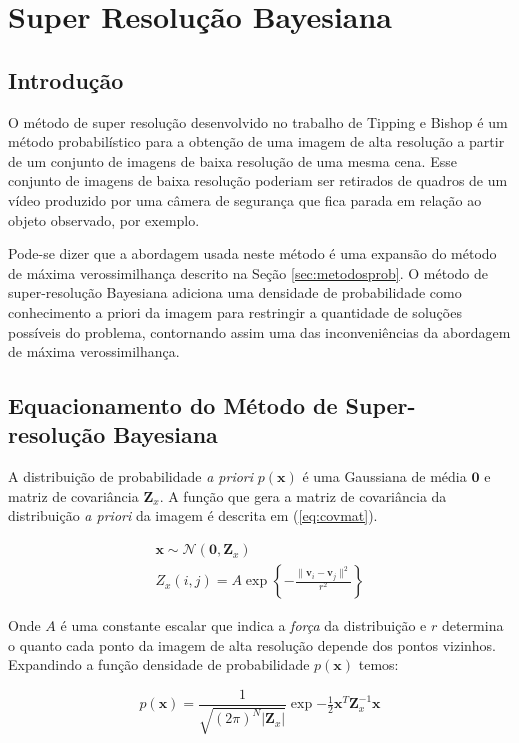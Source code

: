 \chapter{Super Resolução Bayesiana}
\label{chap:srbayes}
\section{Introdução}
O método de super resolução desenvolvido no trabalho de Tipping e Bishop \cite{tipping2003bayesian} é um método probabilístico para a obtenção de uma imagem de alta resolução
a partir de um conjunto de imagens de baixa resolução de uma mesma cena.
Esse conjunto de imagens de baixa resolução poderiam ser retirados de quadros de um
vídeo produzido por uma câmera de segurança que fica parada em relação ao objeto
observado, por exemplo.

Pode-se dizer que a abordagem usada neste método é uma expansão do método de máxima
verossimilhança descrito na Seção \ref{sec:metodosprob}.
O método de super-resolução Bayesiana adiciona uma densidade de probabilidade como
conhecimento a priori da imagem para restringir a quantidade de soluções possíveis do
problema, contornando assim uma das inconveniências da abordagem de máxima verossimilhança.


\section{Equacionamento do Método de Super-resolução Bayesiana}
A distribuição de probabilidade \emph{a priori} $p(\mathbf{x})$ é uma Gaussiana de média $\mathbf{0}$ e matriz de covariância $\mathbf{Z}_x$. A função que gera a matriz de covariância da distribuição \emph{a priori} da imagem é descrita em (\ref{eq:covmat}).

\begin{gather}
	\mathbf{x} \sim \mathcal{N}(\mathbf{0}, \mathbf{Z}_x) \\ 
	\label{eq:covmat} Z_x(i,j) = A \exp \left\{ - \frac{\|\mathbf{v}_i - \mathbf{v}_j \|^2}{r^2} \right\}
\end{gather}

Onde $A$ é uma constante escalar que indica a \emph{força} da distribuição e $r$ determina o quanto cada ponto da imagem de alta resolução depende dos pontos vizinhos.
Expandindo a função densidade de probabilidade $p(\mathbf{x})$ temos:

\begin{equation}
	\label{eq:priordist}
	p(\mathbf{x}) = \frac{1}{\sqrt{(2\pi)^N |\mathbf{Z}_x|}}\exp{-\tfrac{1}{2} \mathbf{x}^T \mathbf{Z}^{-1}_x \mathbf{x}}
\end{equation}

